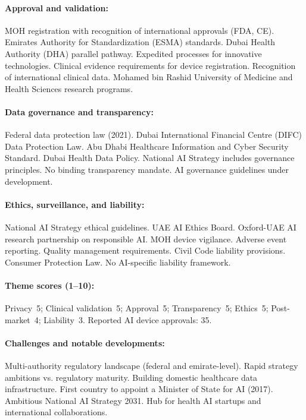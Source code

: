 {\paragraph{Approval and validation:}
MOH registration with recognition of international approvals (FDA, CE). Emirates Authority for Standardization (ESMA) standards. Dubai Health Authority (DHA) parallel pathway. Expedited processes for innovative technologies.
Clinical evidence requirements for device registration. Recognition of international clinical data. Mohamed bin Rashid University of Medicine and Health Sciences research programs.

\paragraph{Data governance and transparency:}
Federal data protection law (2021). Dubai International Financial Centre (DIFC) Data Protection Law. Abu Dhabi Healthcare Information and Cyber Security Standard. Dubai Health Data Policy.
National AI Strategy includes governance principles. No binding transparency mandate. AI governance guidelines under development.

\paragraph{Ethics, surveillance, and liability:}
National AI Strategy ethical guidelines. UAE AI Ethics Board. Oxford-UAE AI research partnership on responsible AI.
MOH device vigilance. Adverse event reporting. Quality management requirements.
Civil Code liability provisions. Consumer Protection Law. No AI-specific liability framework.

\paragraph{Theme scores (1--10):}
Privacy~5;
Clinical validation~5;
Approval~5;
Transparency~5;
Ethics~5;
Post-market~4;
Liability~3.
Reported AI device approvals: 35.

\paragraph{Challenges and notable developments:}
Multi-authority regulatory landscape (federal and emirate-level). Rapid strategy ambitions vs. regulatory maturity. Building domestic healthcare data infrastructure.
First country to appoint a Minister of State for AI (2017). Ambitious National AI Strategy 2031. Hub for health AI startups and international collaborations.


}
